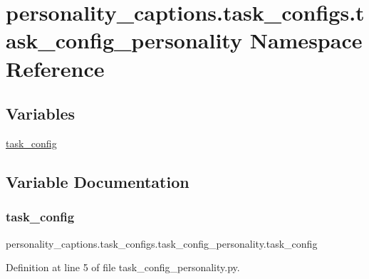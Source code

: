 \hypertarget{namespacepersonality__captions_1_1task__configs_1_1task__config__personality}{}\section{personality\+\_\+captions.\+task\+\_\+configs.\+task\+\_\+config\+\_\+personality Namespace Reference}
\label{namespacepersonality__captions_1_1task__configs_1_1task__config__personality}
\subsection*{Variables}
\begin{DoxyCompactItemize}
\item 
\hyperlink{namespacepersonality__captions_1_1task__configs_1_1task__config__personality_ae2d502818364171a28f8d13e6d6df8d1}{task\+\_\+config}
\end{DoxyCompactItemize}


\subsection{Variable Documentation}
\mbox{\label{namespacepersonality__captions_1_1task__configs_1_1task__config__personality_ae2d502818364171a28f8d13e6d6df8d1}} 
\subsubsection{\texorpdfstring{task\+\_\+config}{task\_config}}
{\footnotesize\ttfamily personality\+\_\+captions.\+task\+\_\+configs.\+task\+\_\+config\+\_\+personality.\+task\+\_\+config}



Definition at line 5 of file task\+\_\+config\+\_\+personality.\+py.

